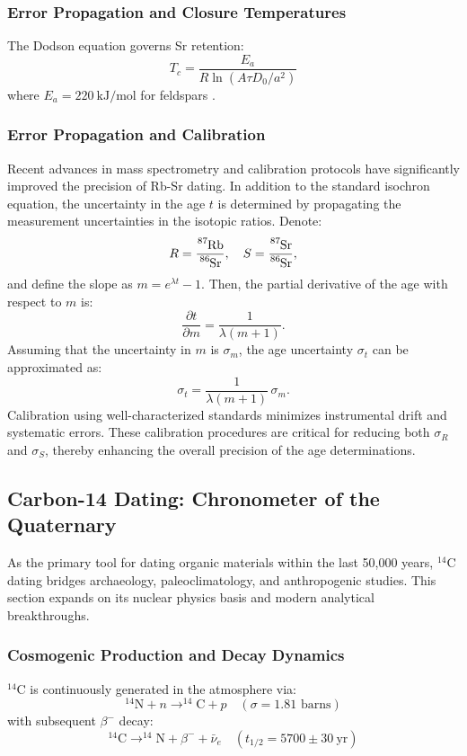 \documentclass{article}
\begin{document}
\subsubsection*{Error Propagation and Closure Temperatures}
The Dodson equation governs Sr retention:
\begin{equation}
    T_c = \frac{E_a}{R \ln\left(A \tau D_0/a^2\right)}
    \label{eq:closure_temp}
\end{equation}
where \(E_a = 220\ \text{kJ/mol}\) for feldspars \cite{Dodson1973}.


\subsubsection*{Error Propagation and Calibration}
Recent advances in mass spectrometry and calibration protocols have significantly improved the precision of Rb-Sr dating. In addition to the standard isochron equation, the uncertainty in the age \(t\) is determined by propagating the measurement uncertainties in the isotopic ratios. Denote:
\[
R = \frac{\ce{^{87}Rb}}{\ce{^{86}Sr}}, \quad S = \frac{\ce{^{87}Sr}}{\ce{^{86}Sr}},
\]
and define the slope as \(m = e^{\lambda t} - 1\). Then, the partial derivative of the age with respect to \(m\) is:
\[
\frac{\partial t}{\partial m} = \frac{1}{\lambda (m + 1)}.
\]
Assuming that the uncertainty in \(m\) is \(\sigma_m\), the age uncertainty \(\sigma_t\) can be approximated as:
\[
\sigma_t = \frac{1}{\lambda (m + 1)} \, \sigma_m.
\]
Calibration using well-characterized standards minimizes instrumental drift and systematic errors. These calibration procedures are critical for reducing both \(\sigma_R\) and \(\sigma_S\), thereby enhancing the overall precision of the age determinations.

\subsection{Carbon-14 Dating: Chronometer of the Quaternary}
\label{subsec:c14_method}

As the primary tool for dating organic materials within the last 50,000 years, \(^{14}\text{C}\) dating bridges archaeology, paleoclimatology, and anthropogenic studies. This section expands on its nuclear physics basis and modern analytical breakthroughs.

\subsubsection*{Cosmogenic Production and Decay Dynamics}
\(^{14}\text{C}\) is continuously generated in the atmosphere via:
\begin{equation}
    ^{14}\text{N} + n \rightarrow ^{14}\text{C} + p \quad (\sigma = 1.81 \text{ barns})
    \label{eq:c14_production}
\end{equation}
with subsequent \(\beta^-\) decay:
\begin{equation}
    ^{14}\text{C} \rightarrow ^{14}\text{N} + \beta^- + \bar{\nu}_e \quad (t_{1/2} = 5700 \pm 30\ \text{yr})
    \label{eq:c14_decay}
\end{equation}
\end{document}
